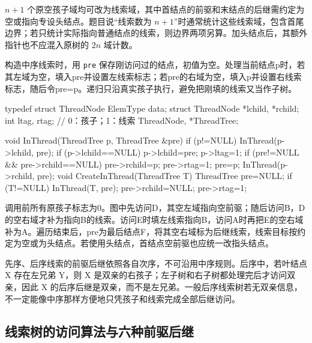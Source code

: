 \(n+1\) 个原空孩子域均可改为线索域，其中首结点的前驱和末结点的后继需约定为空或指向专设头结点。题目说``线索数为 \(n+1\)''时通常统计这些线索域，包含首尾边界；若只统计实际指向普通结点的线索，则边界两项另算。加头结点后，其额外指针也不应混入原树的 \(2n\) 域计数。

构造中序线索时，用 \texttt{pre} 保存刚访问过的结点，初值为空。处理当前结点p时，若其左域为空，填入pre并设置左线索标志；若pre的右域为空，填入p并设置右线索标志，随后令pre=p。递归只沿真实孩子执行，避免把刚填的线索又当作子树。

\par\medskip\noindent\begin{minipage}{\linewidth}
\begin{codeblock}[language=C++]
typedef struct ThreadNode {
    ElemType data;
    struct ThreadNode *lchild, *rchild;
    int ltag, rtag;  // 0：孩子；1：线索
} ThreadNode, *ThreadTree;

void InThread(ThreadTree p, ThreadTree &pre) {
    if (p!=NULL) {
        InThread(p->lchild, pre);
        if (p->lchild==NULL) {
            p->lchild=pre;
            p->ltag=1;
        }
        if (pre!=NULL && pre->rchild==NULL) {
            pre->rchild=p;
            pre->rtag=1;
        }
        pre=p;
        InThread(p->rchild, pre);
    }
}
void CreateInThread(ThreadTree T) {
    ThreadTree pre=NULL;
    if (T!=NULL) {
        InThread(T, pre);
        pre->rchild=NULL;
        pre->rtag=1;
    }
}
\end{codeblock}
\end{minipage}\par\medskip

调用前所有原孩子标志为0。图中先访问D，其空左域指向空前驱；随后访问B，D的空右域才补为指向B的线索。访问E时填左线索指向B，访问A时再把E的空右域补为A。遍历结束后，pre为最后结点F，将其空右域标为后继线索，线索目标按约定为空或为头结点。若使用头结点，首结点空前驱也应统一改指头结点。

先序、后序线索的前驱后继依照各自次序，不可沿用中序规则。后序中，若叶结点 X 存在左兄弟 Y，则 X 是双亲的右孩子；左子树和右子树都处理完后才访问双亲，因此 X 的后序后继是双亲，而不是左兄弟。一般后序线索树若无双亲信息，不一定能像中序那样方便地只凭孩子和线索完成全部后继访问。

\subsection{线索树的访问算法与六种前驱后继}\label{DS05-thread-access}

